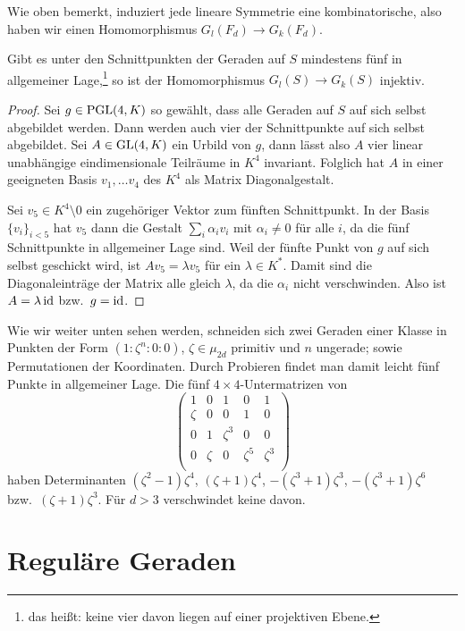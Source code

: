 Wie oben bemerkt, induziert jede lineare Symmetrie eine kombinatorische, also haben wir einen Homomorphismus $G_l(F_d) \to G_k(F_d)$.
\begin{prop}
Gibt es unter den Schnittpunkten der Geraden auf $S$ mindestens fünf in allgemeiner Lage,\footnote{das heißt: keine vier davon liegen auf einer projektiven Ebene.} so ist der Homomorphismus $G_l(S) \to G_k(S)$ injektiv.
\end{prop}
\begin{proof}
Sei $g \in \mathrm{PGL}(4,K)$ so gewählt, dass alle Geraden auf $S$ auf sich selbst abgebildet werden. Dann werden auch vier der Schnittpunkte auf sich selbst abgebildet. Sei $A \in \mathrm{GL}(4,K)$ ein Urbild von $g$, dann lässt also $A$ vier linear unabhängige eindimensionale Teilräume in $K^4$ invariant. Folglich hat $A$ in einer geeigneten Basis ${v_1, \dots v_4}$ des $K^4$ als Matrix Diagonalgestalt.

Sei $v_5 \in K^4 \setminus 0$ ein zugehöriger Vektor zum fünften Schnittpunkt. In der Basis $\{v_i\}_{i<5}$ hat $v_5$ dann die Gestalt $\sum_i \alpha_i v_i$ mit $\alpha_i \neq 0$ für alle $i$, da die fünf Schnittpunkte in allgemeiner Lage sind. Weil der fünfte Punkt von $g$ auf sich selbst geschickt wird, ist $A v_5 = \lambda v_5$ für ein $\lambda \in K^*$. Damit sind die Diagonaleinträge der Matrix alle gleich $\lambda$, da die $\alpha_i$ nicht verschwinden. Also ist $A = \lambda \operatorname{id}$ bzw.~$g = \operatorname{id}$.
\end{proof}
Wie wir weiter unten sehen werden, schneiden sich zwei Geraden einer Klasse in Punkten der Form $(1:\zeta^n:0:0)$, $\zeta \in \mu_{2d}$ primitiv und $n$ ungerade; sowie Permutationen der Koordinaten. Durch Probieren findet man damit leicht fünf Punkte in allgemeiner Lage. Die fünf $4 \times 4$-Untermatrizen von
\begin{equation*}
\begin{pmatrix}
1 & 0 & 1 & 0 & 1 \\
\zeta & 0 & 0 & 1 & 0 \\
0 & 1 & \zeta^3 & 0 & 0 \\
0 & \zeta & 0 & \zeta^5 & \zeta^3 \\
\end{pmatrix}
\end{equation*}
haben Determinanten $(\zeta^2-1)\zeta^4$, $(\zeta+1)\zeta^4$, $-(\zeta^3+1)\zeta^3$, $-(\zeta^3+1)\zeta^6$ bzw.~$(\zeta+1)\zeta^3$. Für $d>3$ verschwindet keine davon.

\section{Reguläre Geraden}
